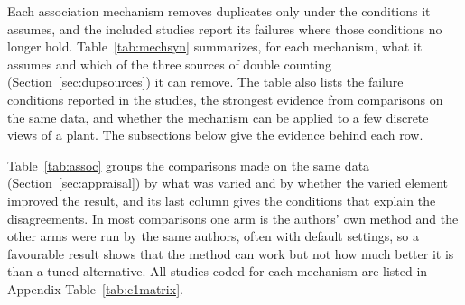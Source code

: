 Each association mechanism removes duplicates only under the conditions it assumes, and the included studies report its failures where those conditions no longer hold. Table~\ref{tab:mechsyn} summarizes, for each mechanism, what it assumes and which of the three sources of double counting (Section~\ref{sec:dupsources}) it can remove. The table also lists the failure conditions reported in the studies, the strongest evidence from comparisons on the same data, and whether the mechanism can be applied to a few discrete views of a plant. The subsections below give the evidence behind each row.

Table~\ref{tab:assoc} groups the comparisons made on the same data (Section~\ref{sec:appraisal}) by what was varied and by whether the varied element improved the result, and its last column gives the conditions that explain the disagreements. In most comparisons one arm is the authors' own method and the other arms were run by the same authors, often with default settings, so a favourable result shows that the method can work but not how much better it is than a tuned alternative. All studies coded for each mechanism are listed in Appendix Table~\ref{tab:c1matrix}.


